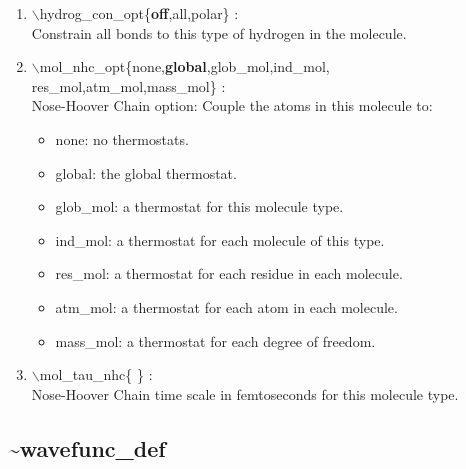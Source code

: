 \documentclass[12pt]{article}
\begin{document}
\begin{enumerate}
 \vspace{0.15in} 
 \item  $\backslash$hydrog\_con\_opt\{{\bf off},all,polar\} : \\
   Constrain all bonds to this type of hydrogen in the molecule.

 \vspace{0.15in} 
 \item  $\backslash$mol\_nhc\_opt\{none,{\bf global},glob\_mol,ind\_mol,\\ 
                 \hspace*{0.5in}res\_mol,atm\_mol,mass\_mol\} :  \\
   Nose-Hoover Chain option: Couple the atoms in this molecule to:
      \begin{itemize}
         \item none:     no thermostats.
         \item global:   the global thermostat.
         \item glob\_mol: a thermostat for this molecule type. 
         \item ind\_mol:  a thermostat for each molecule of this type. 
         \item res\_mol:  a thermostat for each residue in each molecule.
         \item atm\_mol:  a thermostat for each atom in each molecule.
         \item mass\_mol: a thermostat for each degree of freedom.
      \end{itemize}

 \vspace{0.15in} 
 \item  $\backslash$mol\_tau\_nhc\{ \} : \\
   Nose-Hoover Chain time scale in femtoseconds for this molecule type.

\end{enumerate}

\newpage
\subsection*{\bf \~{}wavefunc\_def}
\end{document}
